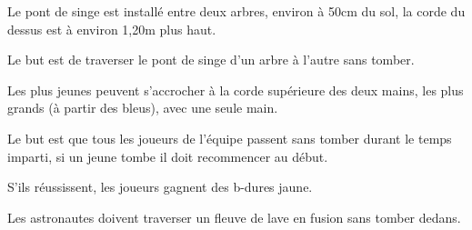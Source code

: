 \documentclass{grand-jeu}
\begin{document}
\begin{liste-materiel}
\end{liste-materiel}

\begin{regles}
Le pont de singe est installé entre deux arbres, environ à 50cm du sol, la corde du dessus est à environ 1,20m plus haut.

Le but est de traverser le pont de singe d'un arbre à l'autre sans tomber. 

Les plus jeunes peuvent s'accrocher à la corde supérieure des deux mains, les plus grands (à partir des bleus), avec une seule main. 

Le but est que tous les joueurs de l'équipe passent sans tomber durant le temps imparti, si un jeune tombe il doit recommencer au début.

S’ils réussissent, les joueurs gagnent des b-dures jaune. 
\end{regles}

\begin{imaginaire}
Les astronautes doivent traverser un fleuve de lave en fusion sans tomber dedans. 
\end{imaginaire}

\begin{moments-stop}
\end{moments-stop}
\end{document}
